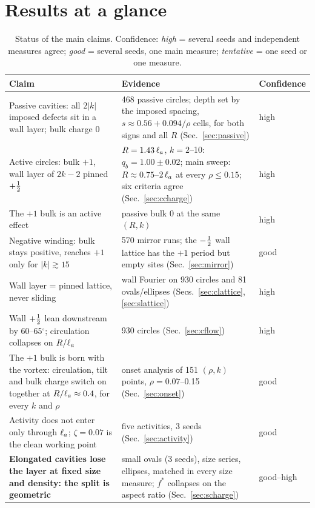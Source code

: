 \section*{Results at a glance}
\begin{table}[H]\centering\small
\caption{Status of the main claims. Confidence: \emph{high} = several seeds and independent measures agree;
\emph{good} = several seeds, one main measure; \emph{tentative} = one seed or one measure.}\label{tab:glance}
\begin{tabularx}{\textwidth}{>{\raggedright\arraybackslash}p{4.3cm}X>{\raggedright\arraybackslash}p{1.8cm}}\toprule
Claim & Evidence & Confidence\\\midrule
Passive cavities: all $2|k|$ imposed defects sit in a wall layer; bulk charge 0 & 468 passive circles; depth set by the imposed spacing, $s\approx0.56+0.094/\rho$ cells, for both signs and all $R$ (Sec.~\ref{sec:passive}) & high\\
Active circles: bulk $+1$, wall layer of $2k-2$ pinned $+\tfrac12$ & $R=1.43\,\ell_a$, $k=2$--10: $q_b=1.00\pm0.02$; main sweep: $R\approx0.75$--$2\,\ell_a$ at every $\rho\le0.15$; six criteria agree (Sec.~\ref{sec:ccharge}) & high\\
The $+1$ bulk is an active effect & passive bulk 0 at the same $(R,k)$ & high\\
Negative winding: bulk stays positive, reaches $+1$ only for $|k|\gtrsim15$ & 570 mirror runs; the $-\tfrac12$ wall lattice has the $+1$ period but empty sites (Sec.~\ref{sec:mirror}) & good\\
Wall layer = pinned lattice, never sliding & wall Fourier on 930 circles and 81 ovals/ellipses (Secs.~\ref{sec:clattice}, \ref{sec:slattice}) & high\\
Wall $+\tfrac12$ lean downstream by 60--65$^\circ$; circulation collapses on $R/\ell_a$ & 930 circles (Sec.~\ref{sec:cflow}) & high\\
The $+1$ bulk is born with the vortex: circulation, tilt and bulk charge switch on together at $R/\ell_a\approx0.4$, for every $k$ and $\rho$ & onset analysis of 151 $(\rho,k)$ points, $\rho=0.07$--0.15 (Sec.~\ref{sec:onset}) & good\\
Activity does not enter only through $\ell_a$; $\zeta=0.07$ is the clean working point & five activities, 3 seeds (Sec.~\ref{sec:activity}) & good\\
\textbf{Elongated cavities lose the layer at fixed size and density: the split is geometric} & small ovals (3 seeds), size series, ellipses, matched in every size measure; $f^*$ collapses on the aspect ratio (Sec.~\ref{sec:scharge}) & good--high\\

\end{tabularx}
\end{table}
